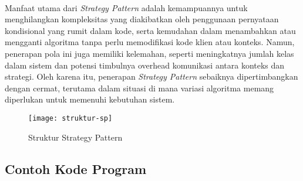 \\
Manfaat utama dari \textit{Strategy Pattern} adalah kemampuannya untuk menghilangkan kompleksitas yang diakibatkan oleh penggunaan pernyataan kondisional yang rumit dalam kode, serta kemudahan dalam menambahkan atau mengganti algoritma tanpa perlu memodifikasi kode klien atau konteks. Namun, penerapan pola ini juga memiliki kelemahan, seperti meningkatnya jumlah kelas dalam sistem dan potensi timbulnya overhead komunikasi antara konteks dan strategi. Oleh karena itu, penerapan \textit{Strategy Pattern} sebaiknya dipertimbangkan dengan cermat, terutama dalam situasi di mana variasi algoritma memang diperlukan untuk memenuhi kebutuhan sistem.

\begin{figure}[h] 
	\centering  
	\texttt{[image: struktur-sp]}  
	\caption{Struktur Strategy Pattern}
	\label{fig:struktursp} 
\end{figure}

\subsection{Contoh Kode Program}
\label{sec:kode}


